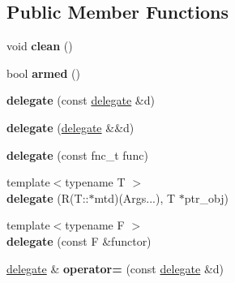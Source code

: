 \subsection*{Public Member Functions}
\begin{DoxyCompactItemize}
\item 
void {\bfseries clean} ()\hypertarget{classgxx_1_1delegate_a05d3145f26fb4746cf9a6b3a66878e2b}{}\label{classgxx_1_1delegate_a05d3145f26fb4746cf9a6b3a66878e2b}

\item 
bool {\bfseries armed} ()\hypertarget{classgxx_1_1delegate_aa099acfe63f6020c9b10fd0a4a66dd38}{}\label{classgxx_1_1delegate_aa099acfe63f6020c9b10fd0a4a66dd38}

\item 
{\bfseries delegate} (const \hyperlink{classgxx_1_1delegate}{delegate} \&d)\hypertarget{classgxx_1_1delegate_aeda82a43206c3c085eb6eeb886520eac}{}\label{classgxx_1_1delegate_aeda82a43206c3c085eb6eeb886520eac}

\item 
{\bfseries delegate} (\hyperlink{classgxx_1_1delegate}{delegate} \&\&d)\hypertarget{classgxx_1_1delegate_a6620927526106282562e9adabe6ed41e}{}\label{classgxx_1_1delegate_a6620927526106282562e9adabe6ed41e}

\item 
{\bfseries delegate} (const fnc\+\_\+t func)\hypertarget{classgxx_1_1delegate_a4af7c79563f2d8904aa47cb2356270f5}{}\label{classgxx_1_1delegate_a4af7c79563f2d8904aa47cb2356270f5}

\item 
{\footnotesize template$<$typename T $>$ }\\{\bfseries delegate} (R(T\+::$\ast$mtd)(Args...), T $\ast$ptr\+\_\+obj)\hypertarget{classgxx_1_1delegate_ada0fc8f4b45e96e1cc7005975f136bc9}{}\label{classgxx_1_1delegate_ada0fc8f4b45e96e1cc7005975f136bc9}

\item 
{\footnotesize template$<$typename F $>$ }\\{\bfseries delegate} (const F \&functor)\hypertarget{classgxx_1_1delegate_a2cfc41012504d91f7f8e69d297c75f3b}{}\label{classgxx_1_1delegate_a2cfc41012504d91f7f8e69d297c75f3b}

\item 
\hyperlink{classgxx_1_1delegate}{delegate} \& {\bfseries operator=} (const \hyperlink{classgxx_1_1delegate}{delegate} \&d)\hypertarget{classgxx_1_1delegate_af6cc59c9a81f36da06aceead7dd0b6e5}{}\label{classgxx_1_1delegate_af6cc59c9a81f36da06aceead7dd0b6e5}


\end{DoxyCompactItemize}

